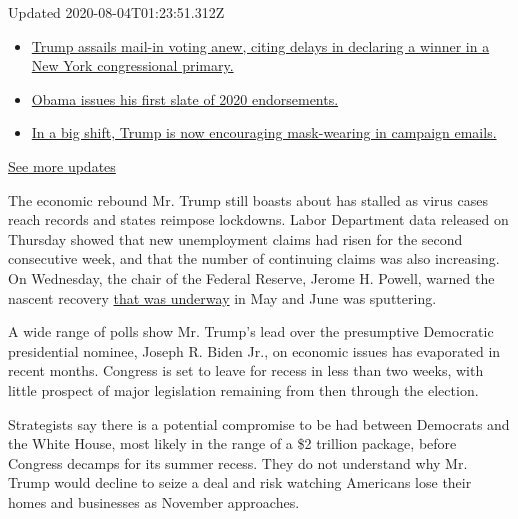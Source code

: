 Updated 2020-08-04T01:23:51.312Z

\begin{itemize}
\tightlist
\item
  \href{https://www.nytimes3xbfgragh.onion/2020/08/03/us/elections/biden-vs-trump.html?action=click\&pgtype=Article\&state=default\&region=MAIN_CONTENT_1\&context=storylines_live_updates\#link-6494b448}{Trump
  assails mail-in voting anew, citing delays in declaring a winner in a
  New York congressional primary.}
\item
  \href{https://www.nytimes3xbfgragh.onion/2020/08/03/us/elections/biden-vs-trump.html?action=click\&pgtype=Article\&state=default\&region=MAIN_CONTENT_1\&context=storylines_live_updates\#link-3de249e6}{Obama
  issues his first slate of 2020 endorsements.}
\item
  \href{https://www.nytimes3xbfgragh.onion/2020/08/03/us/elections/biden-vs-trump.html?action=click\&pgtype=Article\&state=default\&region=MAIN_CONTENT_1\&context=storylines_live_updates\#link-54e34d20}{In
  a big shift, Trump is now encouraging mask-wearing in campaign
  emails.}
\end{itemize}

\href{https://www.nytimes3xbfgragh.onion/2020/08/03/us/elections/biden-vs-trump.html?action=click\&pgtype=Article\&state=default\&region=MAIN_CONTENT_1\&context=storylines_live_updates}{See
more updates}

The economic rebound Mr. Trump still boasts about has stalled as virus
cases reach records and states reimpose lockdowns. Labor Department data
released on Thursday showed that new unemployment claims had risen for
the second consecutive week, and that the number of continuing claims
was also increasing. On Wednesday, the chair of the Federal Reserve,
Jerome H. Powell, warned the nascent recovery
\href{https://www.nytimes3xbfgragh.onion/2020/07/29/business/economy/federal-reserve-meeting-interest-rates.html}{that
was underway} in May and June was sputtering.

A wide range of polls show Mr. Trump's lead over the presumptive
Democratic presidential nominee, Joseph R. Biden Jr., on economic issues
has evaporated in recent months. Congress is set to leave for recess in
less than two weeks, with little prospect of major legislation remaining
from then through the election.

Strategists say there is a potential compromise to be had between
Democrats and the White House, most likely in the range of a \$2
trillion package, before Congress decamps for its summer recess. They do
not understand why Mr. Trump would decline to seize a deal and risk
watching Americans lose their homes and businesses as November
approaches.

